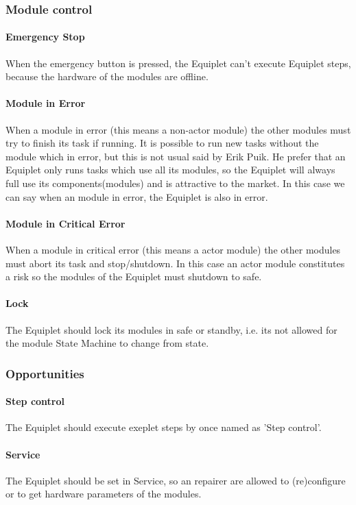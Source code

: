 \subsubsection{Module control}
\paragraph{Emergency Stop}
When the emergency button is pressed, the Equiplet can't execute Equiplet steps, because the hardware of the modules are offline.
\paragraph{Module in Error}
When a module in error (this means a non-actor module) the other modules must try to finish its task if running. It is possible to run new tasks without the module which in error, but this is not usual said by Erik Puik. He prefer that an Equiplet only runs tasks which use all its modules, so the Equiplet will always full use its components(modules) and is attractive to the market. In this case we can say when an module in error, the Equiplet is also in error.
\paragraph{Module in Critical Error}
When a module in critical error (this means a actor module) the other modules must abort its task and stop/shutdown. In this case an actor module constitutes a risk so the modules of the Equiplet must shutdown to safe.
\paragraph{Lock}The Equiplet should lock its modules in safe or standby, i.e. its not allowed for the module State Machine to change from state.

\subsubsection{Opportunities}
\paragraph{Step control}The Equiplet should execute exeplet steps by once named as 'Step control'.
\paragraph{Service}The Equiplet should be set in Service, so an repairer are allowed to (re)configure or to get hardware parameters of the modules.
